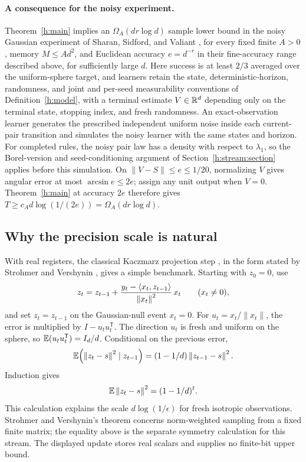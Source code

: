 \paragraph{A consequence for the noisy experiment.}
Theorem~\ref{h:main} implies an
\(\Omega_A(d r\log d)\) sample lower bound in the noisy Gaussian
experiment of Sharan, Sidford, and Valiant \cite{SSV2019}, for every
fixed finite \(A>0\), memory \(M\le Ad^2\), and Euclidean accuracy
\(e=d^{-r}\) in their fine-accuracy range described above,
for sufficiently large \(d\). Here success is at least \(2/3\)
averaged over the uniform-sphere target, and learners retain the state,
deterministic-horizon, randomness, and joint and per-seed measurability
conventions of Definition~\ref{h:model}, with a terminal estimate
\(V\in\mathbb R^d\) depending only on the terminal state, stopping index,
and fresh randomness. An exact-observation learner generates the
prescribed independent uniform noise inside each current-pair
transition and simulates the noisy learner with the same states and
horizon. For completed rules, the noisy pair law has a density with
respect to \(\lambda_1\), so the Borel-version and seed-conditioning
argument of Section~\ref{h:stream:section} applies before this
simulation. On \(\|V-S\|\le e\le1/20\), normalizing \(V\) gives
angular error at most \(\arcsin e\le2e\); assign any unit output when
\(V=0\). Theorem~\ref{h:main} at accuracy \(2e\) therefore gives
\(T\ge c_A d\log(1/(2e))=\Omega_A(d r\log d)\).

\subsection{Why the precision scale is natural}

With real registers, the classical Kaczmarz projection step
\cite{Kaczmarz1937}, in the form stated by Strohmer and Vershynin
\cite[Algorithm~1]{SV2009}, gives a simple benchmark. Starting with
\(z_0=0\), use
\begin{equation}\label{h:kaczmarz}
 z_t=z_{t-1}+
 \frac{y_t-\langle x_t,z_{t-1}\rangle}{\left\lVert x_t\right\rVert^2}\,x_t
 \qquad(x_t\ne0),
\end{equation}
and set \(z_t=z_{t-1}\) on the Gaussian-null event \(x_t=0\).
For \(u_t=x_t/\|x_t\|\), the error is multiplied by
\(I-u_tu_t^{\mathsf T}\). The direction \(u_t\) is fresh and uniform
on the sphere, so \(\mathbb E(u_tu_t^{\mathsf T})=I_d/d\). Conditional on
the previous error,
\[
 \mathbb E\!\left(\left\lVert z_t-s\right\rVert^2\mid z_{t-1}\right)
  =(1-1/d)\left\lVert z_{t-1}-s\right\rVert^2.
\]
Induction gives
\begin{equation}\label{h:kaczmarz-contraction}
 \mathbb E\left\lVert z_t-s\right\rVert^2=(1-1/d)^t.
\end{equation}
This calculation explains the scale \(d\log(1/\epsilon)\) for fresh
isotropic observations. Strohmer and Vershynin's theorem concerns
norm-weighted sampling from a fixed finite matrix; the equality above
is the separate symmetry calculation for this stream. The displayed
update stores real scalars and supplies no finite-bit upper bound.

